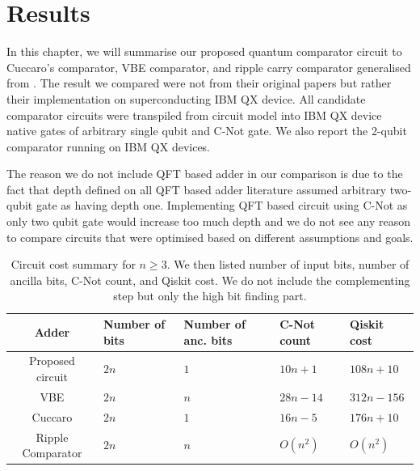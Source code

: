 \chapter{Results}

In this chapter, we will summarise our proposed quantum comparator circuit to Cuccaro's comparator, VBE comparator, and ripple carry comparator generalised from \citep{Sarker2014, Oliveira2006, Beckman1996}. The result we compared were not from their original papers but rather their implementation on superconducting IBM QX device. All candidate comparator circuits were transpiled from circuit model into IBM QX device native gates of arbitrary single qubit and C-Not gate. We also report the 2-qubit comparator running on IBM QX devices.

The reason we do not include QFT based adder in our comparison is due to the fact that depth defined on all QFT based adder literature assumed arbitrary two-qubit gate as having depth one. Implementing QFT based circuit using C-Not as only two qubit gate would increase too much depth and we do not see any reason to compare circuits that were optimised based on different assumptions and goals.

\begin{table}[b]
    \centering
        \begingroup
        \renewcommand*{\arraystretch}{1.7}
        \begin{tabular}{|| c || C{1.5cm} | C{1.5cm} | C{1.5cm} | C{3cm} ||} 
            \hline
            Adder               & Number of bits & Number of anc. bits & C-Not count & Qiskit cost \\ [0.5ex] 
            \hline\hline
            Proposed circuit    & $2n$  & $1$   & $10n+1$       & $108n+10$ \\
            \hline
            VBE                 & $2n$  & $n$   & $28n-14$      & $312n-156$ \\
            \hline
            Cuccaro             & $2n$  & $1$   & $16n-5$       & $176n+10$ \\
            \hline
            Ripple Comparator   & $2n$  & $n$   & $O({n^2})$    & $O({n^2})$ \\ [1ex]
            \hline  
            
        \end{tabular}
        \endgroup
    
    \caption[Circuit cost summary]{Circuit cost summary for $n \geq 3$. We then listed number of input bits, number of ancilla bits, C-Not count, and Qiskit cost. We do not include the complementing step but only the high bit finding part.}
    \label{tab:compresult}
\end{table}

